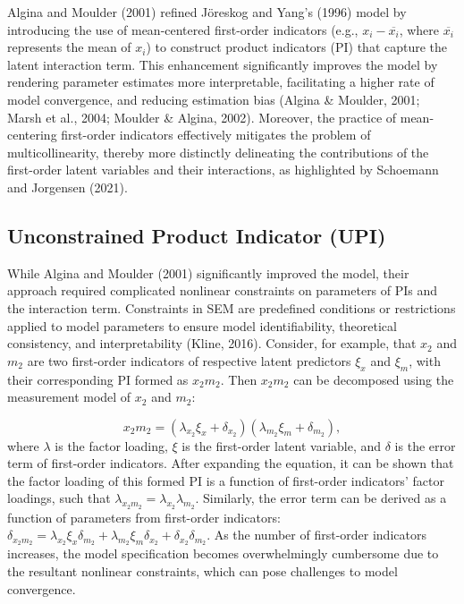 \documentclass[
  man,mask]{apa6}
\begin{document}
Algina and Moulder (2001) refined Jöreskog and Yang's (1996) model by introducing the use of mean-centered first-order indicators (e.g., \(x_{i} - \overline{x_{i}}\), where \(\overline{x_{i}}\) represents the mean of \(x_{i}\)) to construct product indicators (PI) that capture the latent interaction term. This enhancement significantly improves the model by rendering parameter estimates more interpretable, facilitating a higher rate of model convergence, and reducing estimation bias (Algina \& Moulder, 2001; Marsh et al., 2004; Moulder \& Algina, 2002). Moreover, the practice of mean-centering first-order indicators effectively mitigates the problem of multicollinearity, thereby more distinctly delineating the contributions of the first-order latent variables and their interactions, as highlighted by Schoemann and Jorgensen (2021).

\subsection{Unconstrained Product Indicator (UPI)}\label{unconstrained-product-indicator-upi}

While Algina and Moulder (2001) significantly improved the model, their approach required complicated nonlinear constraints on parameters of PIs and the interaction term. Constraints in SEM are predefined conditions or restrictions applied to model parameters to ensure model identifiability, theoretical consistency, and interpretability (Kline, 2016). Consider, for example, that \(x_{2}\) and \(m_{2}\) are two first-order indicators of respective latent predictors \(\xi_{x}\) and \(\xi_{m}\), with their corresponding PI formed as \(x_{2}m_{2}\). Then \(x_{2}m_{2}\) can be decomposed using the measurement model of \(x_{2}\) and \(m_{2}\):

\begin{equation}
x_{2}m_{2}= (\lambda_{x_{2}}\xi_{x} + \delta_{x_{2}})(\lambda_{m_{2}}\xi_{m} + \delta_{m_{2}}),
\end{equation}
where \(\lambda\) is the factor loading, \(\xi\) is the first-order latent variable, and \(\delta\) is the error term of first-order indicators. After expanding the equation, it can be shown that the factor loading of this formed PI is a function of first-order indicators' factor loadings, such that \(\lambda_{x_{2}m_{2}} = \lambda_{x_{2}}\lambda_{m_{2}}\). Similarly, the error term can be derived as a function of parameters from first-order indicators: \(\delta_{x_{2}m_{2}} = \lambda_{x_{2}}\xi_{x}\delta_{m_{2}} + \lambda_{m_{2}}\xi_{m}\delta_{x_{2}} + \delta_{x_{2}}\delta_{m_{2}}\). As the number of first-order indicators increases, the model specification becomes overwhelmingly cumbersome due to the resultant nonlinear constraints, which can pose challenges to model convergence.
\end{document}
